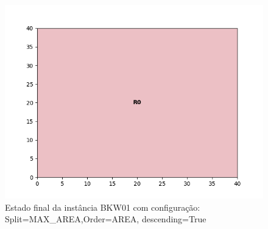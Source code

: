 \begin{figure}[H]
    \centering
    \caption[]{Estado final da instância BKW01 com configuração: Split=MAX_AREA,Order=AREA, descending=True}
    \label{fig:bkw01-max_area-area-true}
    \includegraphics[scale=0.5]{output/figures/bkw/bkw01/max_area/area/true/00}
\end{figure}